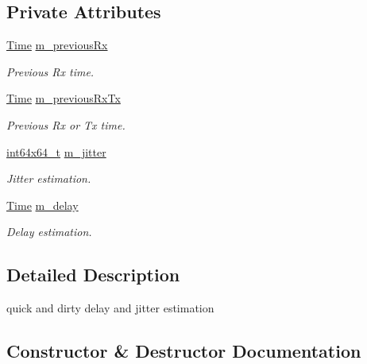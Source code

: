 \subsection*{Private Attributes}
\begin{DoxyCompactItemize}
\item 
\hyperlink{classns3_1_1Time}{Time} \hyperlink{classns3_1_1DelayJitterEstimation_a19f18c143edbdd4c2939af12c686ee2c}{m\+\_\+previous\+Rx}
\begin{DoxyCompactList}\small\item\em Previous Rx time. \end{DoxyCompactList}\item 
\hyperlink{classns3_1_1Time}{Time} \hyperlink{classns3_1_1DelayJitterEstimation_ae072ffd2955965756add116846e5d9e5}{m\+\_\+previous\+Rx\+Tx}
\begin{DoxyCompactList}\small\item\em Previous Rx or Tx time. \end{DoxyCompactList}\item 
\hyperlink{classint64x64__t}{int64x64\+\_\+t} \hyperlink{classns3_1_1DelayJitterEstimation_a7bcede70a5da4cab9a0571e649c8e80a}{m\+\_\+jitter}
\begin{DoxyCompactList}\small\item\em Jitter estimation. \end{DoxyCompactList}\item 
\hyperlink{classns3_1_1Time}{Time} \hyperlink{classns3_1_1DelayJitterEstimation_accc7cfcabc4ec0f292ef70ef834448db}{m\+\_\+delay}
\begin{DoxyCompactList}\small\item\em Delay estimation. \end{DoxyCompactList}\end{DoxyCompactItemize}


\subsection{Detailed Description}
quick and dirty delay and jitter estimation 

\subsection{Constructor \& Destructor Documentation}
